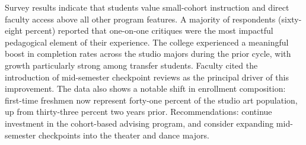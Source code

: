 Survey results indicate that students value small-cohort instruction
and direct faculty access above all other program features. A majority
of respondents (sixty-eight percent) reported that one-on-one critiques
were the most impactful pedagogical element of their experience. The
college experienced a meaningful boost in completion rates across the
studio majors during the prior cycle, with growth particularly strong
among transfer students. Faculty cited the introduction of mid-semester
checkpoint reviews as the principal driver of this improvement. The
data also shows a notable shift in enrollment composition: first-time
freshmen now represent forty-one percent of the studio art population,
up from thirty-three percent two years prior. Recommendations: continue
investment in the cohort-based advising program, and consider expanding
mid-semester checkpoints into the theater and dance majors.
